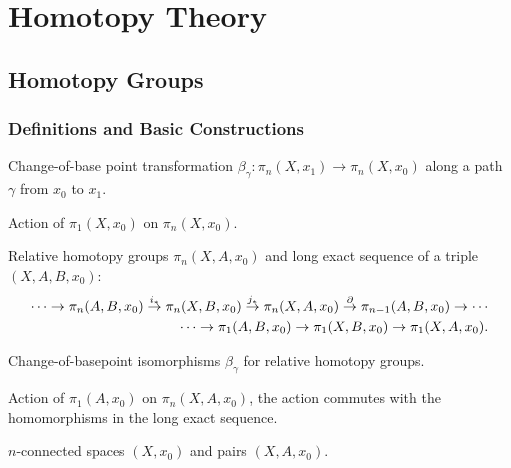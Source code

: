 \section{Homotopy Theory}
\label{sec:HomotopyTheory}
\subsection{Homotopy Groups}
\subsubsection{Definitions and Basic Constructions}
Change-of-base point transformation $\beta_\gamma:\pi_n(X,x_1)\to \pi_n(X,x_0)$ along a path $\gamma$ from $x_0$ to $x_1$. 

\noindent Action of $\pi_1(X,x_0)$ on $\pi_n(X,x_0)$. 

\noindent Relative homotopy groups $\pi_n(X,A,x_0)$ and long exact sequence of a triple $(X,A,B,x_0)$:
\begin{align*}
    \cdots\to\pi_n(A,B,x_0)\overset{i_*}{\to}\pi_n(X,B,x_0)\overset{j_*}{\to}\pi_n(X,A,x_0)\overset{\partial}{\to}\pi_{n-1}(A,B,x_0)\to\cdots \\
    \hfill\cdots\to \pi_1(A,B,x_0) \to \pi_1(X,B,x_0) \to \pi_1(X,A,x_0).
\end{align*}

\noindent Change-of-basepoint isomorphisms $\beta_\gamma$ for relative homotopy groups.

\noindent Action of $\pi_1(A,x_0)$ on $\pi_n(X,A,x_0)$, the action commutes with the homomorphisms in the long exact sequence.

\noindent $n$-connected spaces $(X,x_0)$ and pairs $(X,A,x_0)$.
